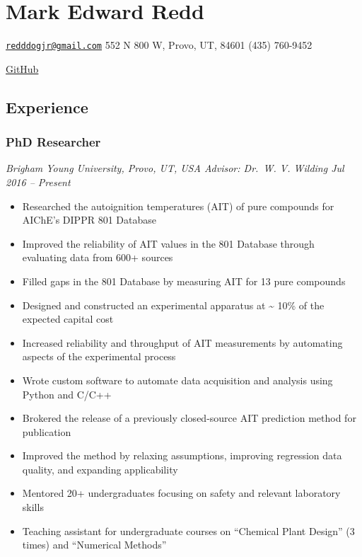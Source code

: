 
\hypertarget{mark-edward-redd}{%
\section{Mark Edward Redd}\label{mark-edward-redd}}

\href{mailto:redddogjr@gmail.com}{\nolinkurl{redddogjr@gmail.com}}
\textbar{} 552 N 800 W, Provo, UT, 84601 \textbar{} (435) 760-9452

\href{https://github.com/flythereddflagg}{GitHub}

\hypertarget{experience}{%
\subsection{Experience}\label{experience}}

\hypertarget{phd-researcher}{%
\subsubsection{PhD Researcher}\label{phd-researcher}}

\emph{Brigham Young University, Provo, UT, USA \textbar{} Advisor:
Dr.~W. V. Wilding \textbar{} Jul 2016 -- Present}

\begin{itemize}
\tightlist
\item
  Researched the autoignition temperatures (AIT) of pure compounds for
  AIChE's DIPPR 801 Database
\item
  Improved the reliability of AIT values in the 801 Database through
  evaluating data from 600+ sources
\item
  Filled gaps in the 801 Database by measuring AIT for 13 pure compounds
\item
  Designed and constructed an experimental apparatus at
  \textasciitilde{} 10\% of the expected capital cost
\item
  Increased reliability and throughput of AIT measurements by automating
  aspects of the experimental process
\item
  Wrote custom software to automate data acquisition and analysis using
  Python and C/C++
\item
  Brokered the release of a previously closed-source AIT prediction
  method for publication
\item
  Improved the method by relaxing assumptions, improving regression data
  quality, and expanding applicability
\item
  Mentored 20+ undergraduates focusing on safety and relevant laboratory
  skills
\item
  Teaching assistant for undergraduate courses on ``Chemical Plant
  Design'' (3 times) and ``Numerical Methods''
\end{itemize}

